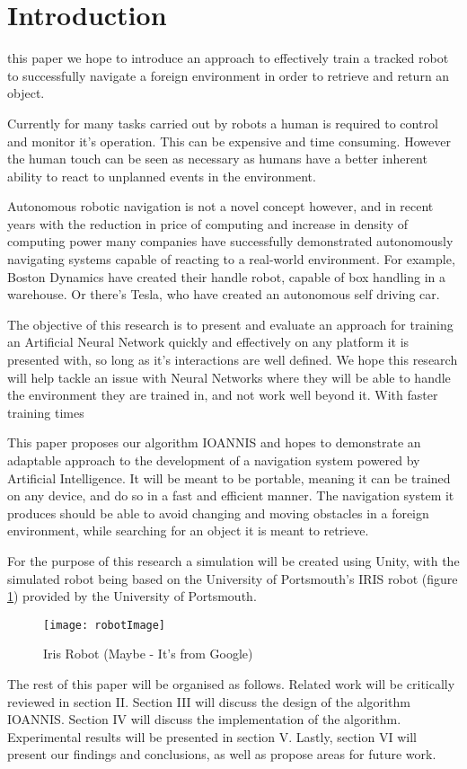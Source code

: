\section{Introduction}
 this paper we hope to introduce an approach to effectively train a tracked robot to successfully navigate a foreign environment in order to retrieve and return an object. 

Currently for many tasks carried out by robots a human is required to control and monitor it's operation. This can be expensive and time consuming. However the human touch can be seen as necessary as humans have a better inherent ability to react to unplanned events in the environment.

Autonomous robotic navigation is not a novel concept however, and in recent years with the reduction in price of computing and increase in density of computing power many companies have successfully demonstrated autonomously navigating systems capable of reacting to a real-world environment. For example, Boston Dynamics have created their handle robot, capable of box handling in a warehouse. Or there's Tesla, who have created an autonomous self driving car. 

The objective of this research is to present and evaluate an approach for training an Artificial Neural Network quickly and effectively on any platform it is presented with, so long as it's interactions are well defined. We hope this research will help tackle an issue with Neural Networks where they will be able to handle the environment they are trained in, and not work well beyond it. With faster training times 

This paper proposes our algorithm IOANNIS and hopes to demonstrate an adaptable approach to the development of a navigation system powered by Artificial Intelligence. It will be meant to be portable, meaning it can be trained on any device, and do so in a fast and efficient manner. The navigation system it produces should be able to avoid changing and moving obstacles in a foreign environment, while searching for an object it is meant to retrieve.

For the purpose of this research a simulation will be created using Unity, with the simulated robot being based on the University of Portsmouth's IRIS robot (figure \ref{fig:irisImage}) provided by the University of Portsmouth.

\begin{figure}[h]
	\begin{center}
		\texttt{[image: robotImage]}
		\caption{Iris Robot (Maybe - It's from Google)}
		\label{fig:irisImage}
	\end{center}
\end{figure}

The rest of this paper will be organised as follows. Related work will be critically reviewed in section II. Section III will discuss the design of the algorithm IOANNIS. Section IV will discuss the implementation of the algorithm. Experimental results will be presented in section V. Lastly, section VI will present our findings and conclusions, as well as propose areas for future work.